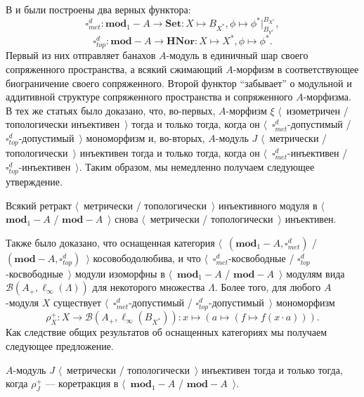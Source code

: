В \cite{HelMetrFrQMod} и \cite{ShtTopFrClassicQuantMod} были построены два верных функтора:
$$
\square_{met}^d:\mathbf{mod}_1-A\to\mathbf{Set}:X\mapsto B_{X^*},\phi\mapsto\phi^*|_{B_{Y^*}}^{B_{X^*}},
$$
$$
\square_{top}^d:\mathbf{mod}-A\to\mathbf{HNor}:X\mapsto X^*,\phi\mapsto\phi^*.
$$
Первый из них отправляет банахов $A$-модуль в единичный шар своего сопряженного пространства, а всякий сжимающий $A$-морфизм в соответствующее биограничение своего сопряженного. Второй функтор ``забывает'' о модульной и аддитивной структуре сопряженного пространства и сопряженного $A$-морфизма.
В тех же статьях было доказано, что, во-первых, $A$-морфизм $\xi$ $\langle$~изометричен / топологически инъективен~$\rangle$ тогда и только тогда, когда он $\langle$~$\square_{met}^d$-допустимый / $\square_{top}^d$-допустимый~$\rangle$ мономорфизм и, во-вторых, $A$-модуль $J$ $\langle$~метрически / топологически~$\rangle$ инъективен тогда и только тогда, когда он $\langle$~$\square_{met}^d$-инъективен / $\square_{top}^d$-инъективен~$\rangle$. Таким образом, мы немедленно получаем следующее утверждение.

\begin{proposition}\label{RetrMetTopInjIsMetTopInj} Всякий ретракт $\langle$~метрически / топологически~$\rangle$ инъективного модуля в $\langle$~$\mathbf{mod}_1-A$ / $\mathbf{mod}-A$~$\rangle$ снова $\langle$~метрически / топологически~$\rangle$ инъективен.
\end{proposition}

Также было доказано, что оснащенная категория $\langle$~$(\mathbf{mod}_1-A,\square_{met}^d)$ / $(\mathbf{mod}-A,\square_{top}^d)$~$\rangle$ косовободолюбива, и что $\langle$~$\square_{met}^d$-косвободные / $\square_{top}^d$-косвободные~$\rangle$ модули изоморфны в $\langle$~$\mathbf{mod}_1-A$ / $\mathbf{mod}-A$~$\rangle$ модулям вида $\mathcal{B}(A_+, \ell_\infty(\Lambda))$ для некоторого множества $\Lambda$. Более того, для любого $A$-модуля $X$ существует $\langle$~$\square_{met}^d$-допустимый / $\square_{top}^d$-допустимый~$\rangle$ мономорфизм
$$
\rho_X^+:X\to\mathcal{B}(A_+,\ell_\infty(B_{X^*})):x\mapsto(a\mapsto(f\mapsto f(x\cdot a))).
$$
Как следствие общих результатов об оснащенных категориях мы получаем следующее предложение.

\begin{proposition}\label{MetTopInjModViaCanonicMorph}
$A$-модуль $J$ $\langle$~метрически / топологически~$\rangle$ инъективен тогда и только тогда, когда $\rho_J^+$ --- коретракция в $\langle$~$\mathbf{mod}_1-A$ / $\mathbf{mod}-A$~$\rangle$.
\end{proposition}

